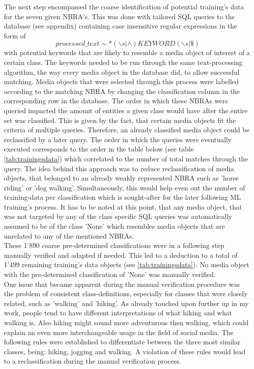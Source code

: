 \newline
The next step encompassed the coarse identification of potential training's data for the seven given NBRA's. This was done with tailored SQL queries to the database (see appendix) containing case insensitive regular expressions in the form of 
\[processed\_text \sim * (\backslash s | \wedge)KEYWORD(\backslash s | \$)\] with potential keywords that are likely to resemble a media object of interest of a certain class. The keywords needed to be run through the same text-processing algorithm, the way every media object in the database did, to allow successful matching. Media objects that were selected through this process were labelled according to the matching NBRA by changing the classification column in the corresponding row in the database. The order in which these NBRAs were queried impacted the amount of entities a given class would have after the entire set was classified. This is given by the fact, that certain media objects fit the criteria of multiple queries. Therefore, an already classified media object could be reclassified by a later query. The order in which the queries were eventually executed corresponds to the order in the table below (see table \ref{tab:trainingsdata}) which correlated to the number of total matches through the query. The idea behind this approach was to reduce reclassification of media objects, that belonged to an already weakly represented NBRA such as 'horse riding' or 'dog walking'. Simultaneously, this would help even out the number of training-data per classification which is sought-after for the later following ML training's process. It has to be noted at this point, that any media object, that was not targeted by any of the class specific SQL queries was automatically assumed to be of the class 'None' which resembles media objects that are unrelated to any of the mentioned NBRAs.\\
These 1'890 coarse pre-determined classifications were in a following step manually verified and adapted if needed. This led to a deduction to a total of 1'499 remaining training's data objects (see \ref{tab:trainingsdata}). No media object with the pre-determined classification of 'None' was manually verified.\\
\newline
One issue that became apparent during the manual verification procedure was the problem of consistent class-definitions, especially for classes that were closely related, such as 'walking' and 'hiking'. As already touched upon further up in my work, people tend to have different interpretations of what hiking and what walking is. Also hiking might sound more adventurous then walking, which could explain an even more interchangeable usage in the field of social media. The following rules were established to differentiate between the three most similar classes, being: hiking, jogging and walking. A violation of these rules would lead to a reclassification during the manual verification process.\\

